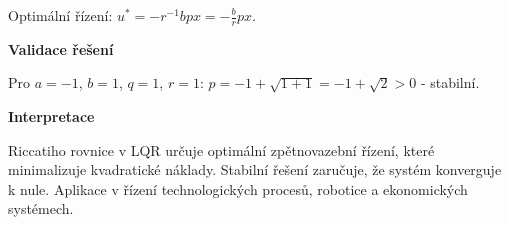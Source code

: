 \begin{example}
Optimální řízení: $u^* = -r^{-1}bpx = -\frac{b}{r}px$.

\vspace{1.5\baselineskip}

\noindent\textbf{Validace řešení}

Pro $a = -1$, $b = 1$, $q = 1$, $r = 1$: $p = -1 + \sqrt{1 + 1} = -1 + \sqrt{2} > 0$ - stabilní.

\vspace{1.5\baselineskip}

\noindent\textbf{Interpretace}

Riccatiho rovnice v LQR určuje optimální zpětnovazební řízení, které minimalizuje 
kvadratické náklady. Stabilní řešení zaručuje, že systém konverguje k nule. 
Aplikace v řízení technologických procesů, robotice a ekonomických systémech.

\end{example}

\vspace{2\baselineskip}

